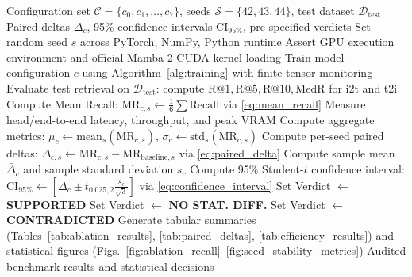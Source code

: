 \documentclass[conference]{IEEEtran}
\begin{document}
\begin{algorithm}[htbp]
\caption{Multi-Seed Experimental Audit Protocol}
\label{alg:audit}
\begin{algorithmic}[1]
\REQUIRE Configuration set $\mathcal{C} = \{c_0, c_1, \dots, c_7\}$, seeds $\mathcal{S} = \{42, 43, 44\}$, test dataset $\mathcal{D}_{\mathrm{test}}$
\ENSURE Paired deltas $\bar{\Delta}_c$, 95\% confidence intervals $\mathrm{CI}_{95\%}$, pre-specified verdicts
        \STATE Set random seed $s$ across PyTorch, NumPy, Python runtime
        \STATE Assert GPU execution environment and official Mamba-2 CUDA kernel loading
        \STATE Train model configuration $c$ using Algorithm~\ref{alg:training} with finite tensor monitoring
        \STATE Evaluate test retrieval on $\mathcal{D}_{\mathrm{test}}$: compute $\mathrm{R@1}, \mathrm{R@5}, \mathrm{R@10}, \mathrm{MedR}$ for i2t and t2i
        \STATE Compute Mean Recall: $\mathrm{MR}_{c, s} \leftarrow \frac{1}{6}\sum \mathrm{Recall}$ via \eqref{eq:mean_recall}
        \STATE Measure head/end-to-end latency, throughput, and peak VRAM
    \ENDFOR
    \STATE Compute aggregate metrics: $\mu_c \leftarrow \mathrm{mean}_s(\mathrm{MR}_{c, s})$, $\sigma_c \leftarrow \mathrm{std}_s(\mathrm{MR}_{c, s})$
        \STATE Compute per-seed paired deltas: $\Delta_{c, s} \leftarrow \mathrm{MR}_{c, s} - \mathrm{MR}_{\mathrm{baseline}, s}$ via \eqref{eq:paired_delta}
        \STATE Compute sample mean $\bar{\Delta}_c$ and sample standard deviation $s_c$
        \STATE Compute 95\% Student-$t$ confidence interval: $\mathrm{CI}_{95\%} \leftarrow [\bar{\Delta}_c \pm t_{0.025, 2} \frac{s_c}{\sqrt{3}}]$ via \eqref{eq:confidence_interval}
            \STATE Set Verdict $\leftarrow$ \textbf{SUPPORTED}
            \STATE Set Verdict $\leftarrow$ \textbf{NO STAT. DIFF.}
        \ELSE
            \STATE Set Verdict $\leftarrow$ \textbf{CONTRADICTED}
        \ENDIF
    \ENDIF
\ENDFOR
\STATE Generate tabular summaries (Tables~\ref{tab:ablation_results}, \ref{tab:paired_deltas}, \ref{tab:efficiency_results}) and statistical figures (Figs.~\ref{fig:ablation_recall}--\ref{fig:seed_stability_metrics})
\RETURN Audited benchmark results and statistical decisions
\end{algorithmic}
\end{algorithm}

\end{document}
